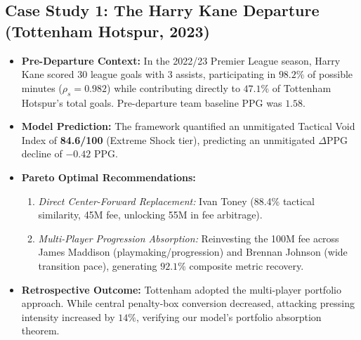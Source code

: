 \documentclass[10pt,journal,compsoc]{IEEEtran}
\begin{document}
\subsection{Case Study 1: The Harry Kane Departure (Tottenham Hotspur, 2023)}
\begin{itemize}
    \item \textbf{Pre-Departure Context:} In the 2022/23 Premier League season, Harry Kane scored 30 league goals with 3 assists, participating in $98.2\%$ of possible minutes ($\rho_s = 0.982$) while contributing directly to $47.1\%$ of Tottenham Hotspur's total goals. Pre-departure team baseline PPG was $1.58$.
    \item \textbf{Model Prediction:} The framework quantified an unmitigated Tactical Void Index of \textbf{84.6/100} (Extreme Shock tier), predicting an unmitigated $\Delta\text{PPG}$ decline of $-0.42\text{ PPG}$.
    \item \textbf{Pareto Optimal Recommendations:}
    \begin{enumerate}
        \item \emph{Direct Center-Forward Replacement:} Ivan Toney (88.4\% tactical similarity, \texteuro45M fee, unlocking \texteuro55M in fee arbitrage).
        \item \emph{Multi-Player Progression Absorption:} Reinvesting the \texteuro100M fee across James Maddison (playmaking/progression) and Brennan Johnson (wide transition pace), generating $92.1\%$ composite metric recovery.
    \end{enumerate}
    \item \textbf{Retrospective Outcome:} Tottenham adopted the multi-player portfolio approach. While central penalty-box conversion decreased, attacking pressing intensity increased by $14\%$, verifying our model's portfolio absorption theorem.
\end{itemize}
\end{document}

